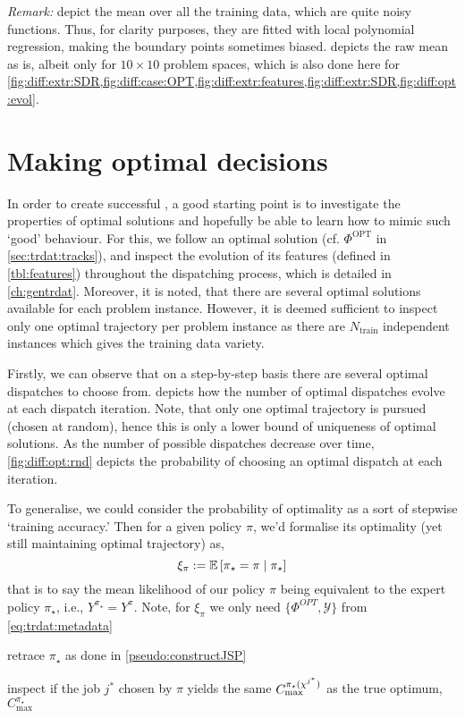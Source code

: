 \emph{Remark:}  
depict the mean over all the training data, which are quite noisy 
functions. Thus, for clarity purposes, they are fitted with local polynomial 
regression, making the boundary points sometimes biased. 
 depicts the raw mean as is, albeit only for $10\times10$ problem 
spaces, which is also done here for 
\cref{fig:diff:extr:SDR,fig:diff:case:OPT,fig:diff:extr:features,fig:diff:extr:SDR,fig:diff:opt:evol}.

\section{Making optimal decisions}
In order to create successful \dr, a good starting point is 
to investigate the properties of optimal solutions and hopefully be able to 
learn how to mimic such `good' behaviour. 
For this, we follow an optimal solution (cf. $\Phi^\text{OPT}$ in 
\cref{sec:trdat:tracks}),
and inspect the evolution of its features  (defined in \cref{tbl:features}) 
throughout the dispatching process, which is detailed in \cref{ch:gentrdat}. 
Moreover, it is noted, that there are several optimal solutions available for 
each problem instance. However, it is deemed sufficient to inspect only one 
optimal trajectory per problem instance as there are $N_{\text{train}}$ 
independent instances which gives the training data variety. 

Firstly, we can observe that on a step-by-step basis there are several optimal 
dispatches to choose from.  depicts how the number of 
optimal dispatches evolve at each dispatch iteration. Note, that only one 
optimal trajectory is pursued (chosen at random), hence this is only a lower 
bound of uniqueness of optimal solutions.
As the number of possible dispatches decrease over time, 
\cref{fig:diff:opt:rnd} 
depicts the probability of choosing an optimal dispatch at each iteration. 

To generalise, we could consider the probability of optimality as a sort of 
stepwise `training accuracy.' Then for a given policy $\pi$, we'd formalise its 
optimality (yet still maintaining optimal trajectory) as, 
\begin{equation} \label{eq:tracc:opt}
    \xi_{\pi} := \Exp{\given{\pi_{\star} = \pi}{\pi_{\star}}}
\end{equation}
that is to say the mean likelihood of our policy $\pi$ being equivalent to the 
expert policy $\pi_\star$, i.e., $Y^{\pi_\star}=Y^\pi$. Note, for $\xi_\pi$ we 
only need $\{\Phi^{OPT},\mathcal{Y}\}$ from \cref{eq:trdat:metadata}
\begin{enumerate*}
    \item retrace $\pi_\star$ as done in \cref{pseudo:constructJSP}
    \item inspect if the job $j^*$ chosen by $\pi$ yields the same 
    $C_{\max}^{\pi_\star({\mathbf{\chi}}^{j^*})}$ as the true optimum, 
    $C_{\max}^{\pi_\star}$
\end{enumerate*}

